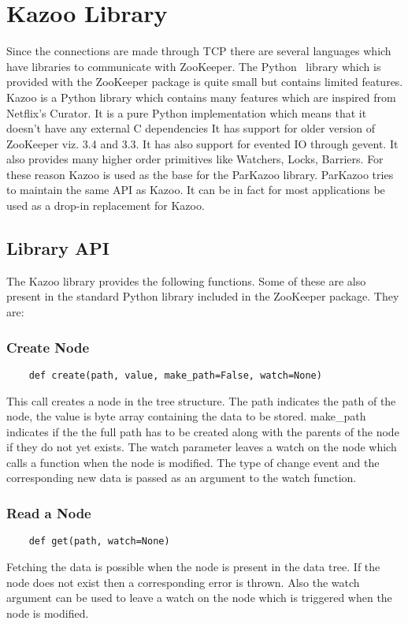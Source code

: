 \section{Kazoo Library}
Since the connections are made through TCP there are several languages which have libraries to communicate with ZooKeeper. The Python~\cite{van2002python} library which is provided with the ZooKeeper package is quite small but contains limited features. Kazoo is a Python library which contains many features which are inspired from Netflix's Curator. It is a pure Python implementation which means that it doesn't have any external C dependencies It has support for older version of ZooKeeper viz. 3.4 and 3.3. It has also support for evented IO through gevent. It also provides many higher order primitives like Watchers, Locks, Barriers. For these reason Kazoo is used as the base for the ParKazoo library. ParKazoo tries to maintain the same API as Kazoo. It can be in fact for most applications be used as a drop-in replacement for Kazoo.

\subsection{Library API}
The Kazoo library provides the following functions. Some of these are also present in the standard Python library included in the ZooKeeper package. They are:
  \subsubsection{Create Node}
  \begin{lstlisting}
    def create(path, value, make_path=False, watch=None)
  \end{lstlisting}
  This call creates a node in the tree structure. The path indicates the path of the node, the value is byte array containing the data to be stored. make\_path indicates if the the full path has to be created along with the parents of the node if they do not yet exists. The watch parameter leaves a watch on the node which calls a function when the node is modified. The type of change event and the corresponding new data is passed as an argument to the watch function.
  \subsubsection{Read a Node}
  \begin{lstlisting}
    def get(path, watch=None)
  \end{lstlisting}
  Fetching the data is possible when the node is present in the data tree. If the node does not exist then a corresponding error is thrown. Also the watch argument can be used to leave a watch on the node which is triggered when the node is modified.
